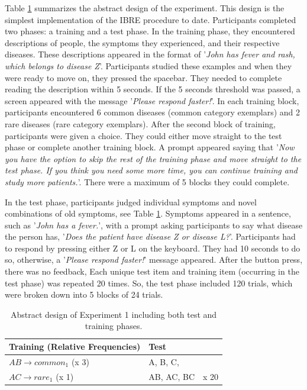 \documentclass[10pt,letterpaper]{article}
\begin{document}
Table \ref{tab:abstract-exp1} summarizes the abstract design of the experiment.
This design is the simplest implementation of the IBRE procedure to date.
Participants completed two phases: a training and a test phase.
In the training phase, they encountered descriptions of people, the symptoms they experienced, and their respective diseases.
These descriptions appeared in the format of '\textit{John has fever and rash, which belongs to disease Z}'.
Participants studied these examples and when they were ready to move on, they pressed the spacebar.
They needed to complete reading the description within 5 seconds.
If the 5 seconds threshold was passed, a screen appeared with the message '\textit{Please respond faster!}'.
In each training block, participants encountered 6 common diseases (common category exemplars) and 2 rare diseases (rare category exemplars).
After the second block of training, participants were given a choice.
They could either move straight to the test phase or complete another training block.
A prompt appeared saying that '\textit{Now you have the option to skip the rest of the training phase and move straight to the test phase. If you think you need some more time, you can continue training and study more patients.}'.
There were a maximum of 5 blocks they could complete.

In the test phase, participants judged individual symptoms and novel combinations of old symptoms, see Table \ref*{tab:abstract-exp1}.
Symptoms appeared in a sentence, such as '\textit{John has a fever.}', with a prompt asking participants to say what disease the person has, '\textit{Does the patient have disease Z or disease L?}'.
Participants had to respond by pressing either Z or L on the keyboard.
They had 10 seconds to do so, otherwise, a '\textit{Please respond faster!}' message appeared.
After the button press, there was no feedback,
Each unique test item and training item (occurring in the test phase) was repeated 20 times.
So, the test phase included 120 trials, which were broken down into 5 blocks of 24 trials.

\begin{table}[!ht]
  \begin{center}
    \caption{Abstract design of Experiment 1 including both test and training phases. \\}
    \label{tab:abstract-exp1}
    \begin{tabular}{llr} %
      \textbf{Training (Relative Frequencies)} & \textbf{Test}& \\
      \hline
      $AB \to common_{1}$ (x 3) &  A, B, C,         &  \\
      $AC \to rare_{1}$   (x 1) &  AB, AC, BC      & x 20 \\
      \hline
    \end{tabular}
  \end{center}
\end{table}
\end{document}
